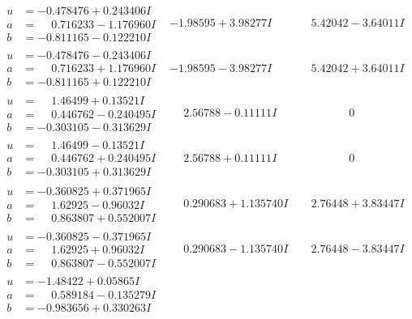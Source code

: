 \documentclass[1p]{elsarticle_modified}
\theoremstyle{definition}
\begin{document}
$$\begin{array}{c|c|c}
\begin{aligned}
u &= -0.478476 + 0.243406 I \\
a &= \phantom{-}0.716233 - 1.176960 I \\
b &= -0.811165 - 0.122210 I\end{aligned}
 & -1.98595 + 3.98277 I & \phantom{-}5.42042 - 3.64011 I \\ \hline\begin{aligned}
u &= -0.478476 - 0.243406 I \\
a &= \phantom{-}0.716233 + 1.176960 I \\
b &= -0.811165 + 0.122210 I\end{aligned}
 & -1.98595 - 3.98277 I & \phantom{-}5.42042 + 3.64011 I \\ \hline\begin{aligned}
u &= \phantom{-}1.46499 + 0.13521 I \\
a &= \phantom{-}0.446762 - 0.240495 I \\
b &= -0.303105 - 0.313629 I\end{aligned}
 & \phantom{-}2.56788 - 0.11111 I & \phantom{-0.000000 } 0 \\ \hline\begin{aligned}
u &= \phantom{-}1.46499 - 0.13521 I \\
a &= \phantom{-}0.446762 + 0.240495 I \\
b &= -0.303105 + 0.313629 I\end{aligned}
 & \phantom{-}2.56788 + 0.11111 I & \phantom{-0.000000 } 0 \\ \hline\begin{aligned}
u &= -0.360825 + 0.371965 I \\
a &= \phantom{-}1.62925 - 0.96032 I \\
b &= \phantom{-}0.863807 + 0.552007 I\end{aligned}
 & \phantom{-}0.290683 + 1.135740 I & \phantom{-}2.76448 + 3.83447 I \\ \hline\begin{aligned}
u &= -0.360825 - 0.371965 I \\
a &= \phantom{-}1.62925 + 0.96032 I \\
b &= \phantom{-}0.863807 - 0.552007 I\end{aligned}
 & \phantom{-}0.290683 - 1.135740 I & \phantom{-}2.76448 - 3.83447 I \\ \hline\begin{aligned}
u &= -1.48422 + 0.05865 I \\
a &= \phantom{-}0.589184 - 0.135279 I \\
b &= -0.983656 + 0.330263 I\end{aligned}

\end{array}$$
\end{document}
